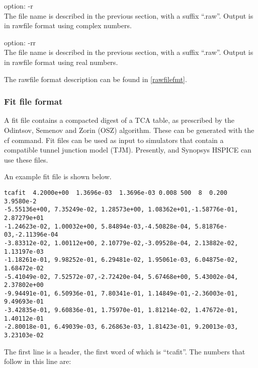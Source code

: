 \begin{description}
\item{option: {\vt -r}}\\
The file name is described in the previous section, with a suffix
``{\vt .raw}''.  Output is in rawfile format using complex numbers.

\item{option: {\vt -rr}}\\
The file name is described in the previous section, with a suffix
``{\vt .raw}''.  Output is in rawfile format using real numbers.
\end{description}

The rawfile format description can be found in \ref{rawfilefmt}.

\subsubsection{Fit file format}

A fit file contains a compacted digest of a TCA table, as prescribed
by the Odintsov, Semenov and Zorin (OSZ) algorithm.  These can be
generated with the {\vt cf} command.  Fit files can be used as input
to simulators that contain a compatible tunnel junction model (TJM). 
Presently, {\WRspice} and Synopsys HSPICE can use these files.

An example fit file is shown below.

\begin{verbatim}
tcafit  4.2000e+00  1.3696e-03  1.3696e-03 0.008 500  8  0.200 3.9580e-2
-5.55136e+00, 7.35249e-02, 1.28573e+00, 1.08362e+01,-1.58776e-01, 2.87279e+01
-1.24623e-02, 1.00032e+00, 5.84894e-03,-4.50828e-04, 5.81876e-03,-2.11396e-04
-3.83312e-02, 1.00112e+00, 2.10779e-02,-3.09528e-04, 2.13882e-02, 1.13197e-03
-1.18261e-01, 9.98252e-01, 6.29481e-02, 1.95061e-03, 6.04875e-02, 1.68472e-02
-5.41049e-02, 7.52572e-07,-2.72420e-04, 5.67468e+00, 5.43002e-04, 2.37802e+00
-9.94491e-01, 6.50936e-01, 7.80341e-01, 1.14849e-01,-2.36003e-01, 9.49693e-01
-3.42835e-01, 9.60836e-01, 1.75970e-01, 1.81214e-02, 1.47672e-01, 1.40112e-01
-2.80018e-01, 6.49039e-03, 6.26863e-03, 1.81423e-01, 9.20013e-03, 3.23103e-02
\end{verbatim}

The first line is a header, the first word of which is ``{\vt tcafit}''.
The numbers that follow in this line are:

